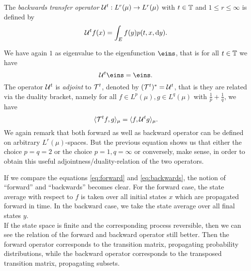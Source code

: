 \begin{defi}
The \textit{backwards transfer operator} $\mathcal{U}^t: L^r(\mu) \rightarrow L^r(\mu)$ with $t \in \mathbb{T}$ and $1 \leq r  \leq \infty$ is defined by
\begin{equation}
\label{eq:backwards}
\mathcal{U}^t f(x) = \int_E f(y) p(t,x,\mathop{}\!\mathrm{d} y).
\end{equation}
\end{defi}
We have again $1$ as eigenvalue to the eigenfunction $\eins$, that is for all $t \in \mathbb{T}$ we have
\begin{equation*}
\Ucal^t \eins = \eins.
\end{equation*}
The operator $\mathcal{U}^t$ is \textit{adjoint} to $\mathcal{T}^t$, denoted by $(\mathcal{T}^t)^{*} = \mathcal{U}^t$, that is they are related via the duality bracket, 
namely for all $f \in L^p(\mu), g \in L^q(\mu)$ with $\frac1p + \frac 1q$, we have
\begin{equation*}
\langle \mathcal{T}^t f, g \rangle_\mu = \langle f, \mathcal{U}^t g \rangle_\mu.
\end{equation*}
We again remark that both forward as well as backward operator can be defined on arbitrary $L^r(\mu)$-spaces. But the previous equation shows us that either the choice $p=q=2$ or the choice $p=1, q= \infty$ or conversely, make sense, in order to obtain this useful adjointness/duality-relation of the two operators.

If we compare the equations \eqref{eq:forward} and \eqref{eq:backwards}, the notion of ``forward'' and ``backwards'' becomes clear. For the forward case, the state average with respect to $f$ is taken over all initial states $x$ which are propagated forward in time. In the backward case, we take the state average over all final states $y$.
\\

If the state space is finite and the corresponding process reversible, then we can see the relation of the forward and backward operator still better.
Then the forward operator corresponds to the transition matrix, propagating probability distributions, while the backward operator corresponds to the transposed transition matrix, propagating subsets.

